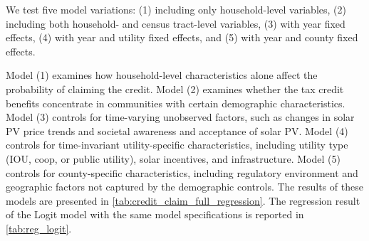 \documentclass[11pt,twoside,letterpaper]{article}
\begin{document}
We test five model variations: (1) including only household-level variables, (2) including both household- and census tract-level variables, (3) with year fixed effects, (4) with year and utility fixed effects, and (5) with year and county fixed effects.

Model (1) examines how household-level characteristics alone affect the probability of claiming the credit. Model (2) examines whether the tax credit benefits concentrate in communities with certain demographic characteristics. Model (3) controls for time-varying unobserved factors, such as changes in solar PV price trends and societal awareness and acceptance of solar PV. Model (4) controls for time-invariant utility-specific characteristics, including utility type (IOU, coop, or public utility), solar incentives, and infrastructure. Model (5) controls for county-specific characteristics, including regulatory environment and geographic factors not captured by the demographic controls. The results of these models are presented in \autoref{tab:credit_claim_full_regression}. The regression result of the Logit model with the same model specifications is reported in \autoref{tab:reg_logit}.
\end{document}
